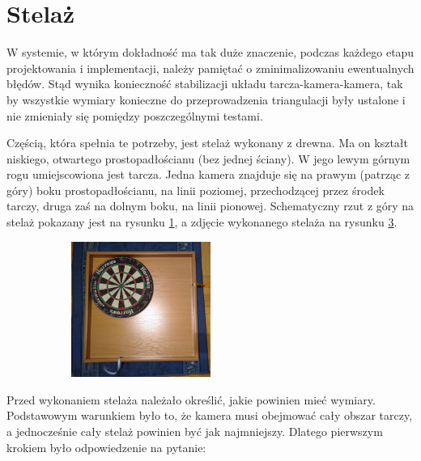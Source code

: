 \section{Stelaż}
W systemie, w którym dokładność ma tak duże znaczenie, podczas każdego etapu projektowania i implementacji, należy pamiętać o zminimalizowaniu ewentualnych błędów. Stąd wynika konieczność stabilizacji układu tarcza-kamera-kamera, tak by wszystkie wymiary konieczne do przeprowadzenia triangulacji były ustalone i nie zmieniały się pomiędzy poszczególnymi testami. 

Częścią, która spełnia te potrzeby, jest stelaż wykonany z drewna. Ma on kształt niskiego, otwartego prostopadłościanu (bez jednej ściany). W jego lewym górnym rogu umiejscowiona jest tarcza. Jedna kamera znajduje się na prawym (patrząc z góry) boku prostopadłościanu, na linii poziomej, przechodzącej przez środek tarczy, druga zaś na dolnym boku, na linii pionowej. Schematyczny rzut z góry na stelaż pokazany jest na rysunku \ref{stelaz_gora}, a zdjęcie wykonanego stelaża na rysunku \ref{stelaz_zdjecie}.

\begin{figure}[h!]
\centering
\begin{subfigure}{\textwidth}
  \centering
  
  \label{stelaz_gora}
\end{subfigure}
\begin{subfigure}{\textwidth}
  \vspace{1cm}
  \centering
  \includegraphics[width=0.5\textwidth]{obrazki/stelaz_live.jpg}
  \label{stelaz_zdjecie}
\end{subfigure}
\end{figure}

Przed wykonaniem stelaża należało określić, jakie powinien mieć wymiary. Podstawowym warunkiem było to, że kamera musi obejmować cały obszar tarczy, a jednocześnie cały stelaż powinien być jak najmniejszy. Dlatego pierwszym krokiem było odpowiedzenie na pytanie:


